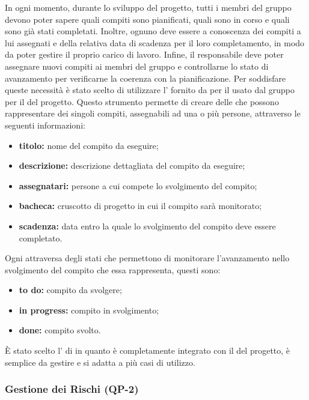 			In ogni momento, durante lo sviluppo del progetto, tutti i membri del gruppo devono poter sapere quali compiti sono pianificati, quali sono in corso e quali sono già stati completati. Inoltre, ognuno deve essere a conoscenza dei compiti a lui assegnati e della relativa data di scadenza per il loro completamento, in modo da poter gestire il proprio carico di lavoro. Infine, il responsabile deve poter assegnare nuovi compiti ai membri del gruppo e controllarne lo stato di avanzamento per verificarne la coerenza con la pianificazione.
			\newline
			Per soddisfare queste necessità è stato scelto di utilizzare l' fornito da  per il  usato dal gruppo per il  del progetto.
			\newline
			Questo strumento permette di creare delle  che possono rappresentare dei singoli compiti, assegnabili ad una o più persone, attraverso le seguenti informazioni:
			\begin{itemize}
				\item \textbf{titolo:} nome del compito da eseguire;
				\item \textbf{descrizione:} descrizione dettagliata del compito da eseguire;
				\item \textbf{assegnatari:} persone a cui compete lo svolgimento del compito;
				\item \textbf{bacheca:} cruscotto di progetto in cui il compito sarà monitorato;
				\item \textbf{scadenza:} data entro la quale lo svolgimento del compito deve essere completato.
			\end{itemize}
			Ogni  attraversa degli stati che permettono di monitorare l'avanzamento nello svolgimento del compito che essa rappresenta, questi sono:
			\begin{itemize}
				\item \textbf{to do:} compito da svolgere;
				\item \textbf{in progress:} compito in svolgimento;
				\item \textbf{done:} compito svolto.
			\end{itemize}
			È stato scelto l' di  in quanto è completamente integrato con il  del progetto, è semplice da gestire e si adatta a più casi di utilizzo.

		\subsubsection{Gestione dei Rischi (QP-2)}

